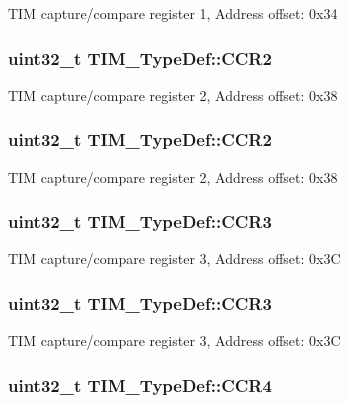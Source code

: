T\-I\-M capture/compare register 1, Address offset\-: 0x34 \hypertarget{struct_t_i_m___type_def_a4d1171e9a61538424b8ef1f2571986d0}{
\subsubsection[{C\-C\-R2}]{ uint32\-\_\-t T\-I\-M\-\_\-\-Type\-Def\-::\-C\-C\-R2}}\label{struct_t_i_m___type_def_a4d1171e9a61538424b8ef1f2571986d0}
T\-I\-M capture/compare register 2, Address offset\-: 0x38 \hypertarget{struct_t_i_m___type_def_a4d1171e9a61538424b8ef1f2571986d0}{
\subsubsection[{C\-C\-R2}]{ uint32\-\_\-t T\-I\-M\-\_\-\-Type\-Def\-::\-C\-C\-R2}}\label{struct_t_i_m___type_def_a4d1171e9a61538424b8ef1f2571986d0}
T\-I\-M capture/compare register 2, Address offset\-: 0x38 \hypertarget{struct_t_i_m___type_def_ac83441bfb8d0287080dcbd945a272a74}{
\subsubsection[{C\-C\-R3}]{ uint32\-\_\-t T\-I\-M\-\_\-\-Type\-Def\-::\-C\-C\-R3}}\label{struct_t_i_m___type_def_ac83441bfb8d0287080dcbd945a272a74}
T\-I\-M capture/compare register 3, Address offset\-: 0x3\-C \hypertarget{struct_t_i_m___type_def_ac83441bfb8d0287080dcbd945a272a74}{
\subsubsection[{C\-C\-R3}]{ uint32\-\_\-t T\-I\-M\-\_\-\-Type\-Def\-::\-C\-C\-R3}}\label{struct_t_i_m___type_def_ac83441bfb8d0287080dcbd945a272a74}
T\-I\-M capture/compare register 3, Address offset\-: 0x3\-C \hypertarget{struct_t_i_m___type_def_a5ba381c3f312fdf5e0b4119641b3b0aa}{
\subsubsection[{C\-C\-R4}]{ uint32\-\_\-t T\-I\-M\-\_\-\-Type\-Def\-::\-C\-C\-R4}}\label{struct_t_i_m___type_def_a5ba381c3f312fdf5e0b4119641b3b0aa}
